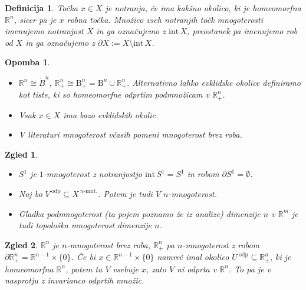 \documentclass[10pt, a4paper]{article}
\newtheorem{defi}{Definicija}[section]
\newenvironment{noticeB}{%
  \tcolorbox[%
  notitle,
  empty,
  enhanced,  %
  breakable,
  coltext=black,
  colback=white, 
  fontupper=\rmfamily,
  parbox=false,
  noparskip,
  sharp corners,
  boxrule=-1pt,  %
  frame hidden,
  left=7pt,  %
  right=7pt,
  top=5pt,
  bottom=5pt,
  before skip=2.5ex plus 2pt,
  after skip=2.5ex plus 2pt,
  borderline west = {1.5pt}{-0.1pt}{blue!30!black}, %
  overlay unbroken and last={%
    \draw[color=black, line width=1.25pt]
    ($(frame.south west)+(1.pt, -0.1pt)$) -- ++(2em, 0);
  }
  ]}
{\endtcolorbox}
\newenvironment{definicija}{\begin{defi}\begin{noticeB}}{%
    \end{noticeB}\end{defi}}
\newtheorem*{opomba}{Opomba}
\newtheorem{zgled}{Zgled}[section]
\newcommand{\R}{\mathbb {R}}
\newcommand{\intem}{\mathrm{int}\,}
\begin{document}
\begin{definicija}
  Točka $x \in X$ je notranja, če ima kakšno okolico, ki je homeomorfna $\R^n$,
  sicer pa je $x$ robna točka. Množico vseh notranjih točk mnogoterosti 
  imenujemo notranjost $X$ in ga označujemo z $\intem X$, preostanek pa imenujemo rob od $X$
  in ga označujemo z $\partial X := X \setminus \intem X$. 
\end{definicija}

\begin{opomba}
  \begin{itemize}
    \item $\R^n \cong \mathring{B}^n$, $\R^n_+ \cong \mathrm{B}^n_+ = \mathrm{B}^n \cup \R^n _+.$
    Alternativno lahko evklidske okolice definiramo kot tiste, ki so homeomorfne odprtim podmnožicam v $\R^n_+$.
    \item Vsak $x \in X$ ima bazo evklidskih okolic.
    \item V literaturi mnogoterost včasih pomeni mnogoterost brez roba.
  \end{itemize}
\end{opomba}

\begin{zgled}
  \begin{itemize}
    \item $S^1$ je $1$-mnogoterost z notranjostjo $\intem S^1 = S^1$ in robom $\partial S^1 = \emptyset$.
    \item Naj bo $V^{\ \text{odp}} \subseteq X^{\ \text{$n$-mnt.}}$. Potem je tudi $V$ $n$-mnogoterost.
    \item Gladka podmnogoterost (ta pojem poznamo že iz analize) dimenzije $n$ v $\R^m$ je tudi topološka 
    mnogoterost dimenzije $n$.
  \end{itemize}
\end{zgled}

\begin{zgled}
$\R^n$ je $n$-mnogoterost brez roba, $\R^n_+$ pa $n$-mnogoterost z robom $\partial \R^n_+ = \R^{n - 1} \times \{0\}$.
    Če bi $x \in \R^{n - 1} \times \{0\}$ namreč imal okolico $U^{\ \text{odp}}\subseteq \R^n_+$, ki je homeomorfna $\R^n$,
    potem ta $V$ vsebuje $x$, zato $V$ ni odprta v $\R^n$. To pa je v nasprotju z invarianco odprtih množic.  
\end{zgled}
  
\end{document}
